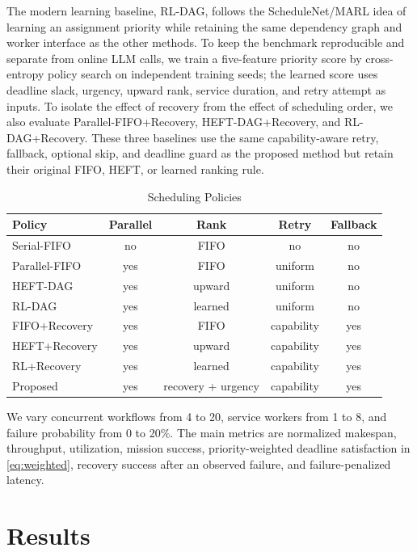 \documentclass[conference]{IEEEtran}
\begin{document}
The modern learning baseline, RL-DAG, follows the ScheduleNet/MARL idea of
learning an assignment priority while retaining the same dependency graph and
worker interface as the other methods. To keep the benchmark reproducible and
separate from online LLM calls, we train a five-feature priority score by
cross-entropy policy search on independent training seeds; the learned score
uses deadline slack, urgency, upward rank, service duration, and retry
attempt as inputs. To isolate the effect of recovery from the effect of
scheduling order, we also evaluate Parallel-FIFO+Recovery, HEFT-DAG+Recovery,
and RL-DAG+Recovery. These three baselines use the same capability-aware
retry, fallback, optional skip, and deadline guard as the proposed method but
retain their original FIFO, HEFT, or learned ranking rule.

\begin{table}[t]
\caption{Scheduling Policies}
\label{tab:policies}
\centering
\scriptsize
\begin{tabular}{p{1.75cm}cccc}
\toprule
\textbf{Policy} & \textbf{Parallel} & \textbf{Rank} & \textbf{Retry} &
\textbf{Fallback}\\
\midrule
Serial-FIFO & no & FIFO & no & no\\
Parallel-FIFO & yes & FIFO & uniform & no\\
HEFT-DAG & yes & upward & uniform & no\\
RL-DAG & yes & learned & uniform & no\\
FIFO+Recovery & yes & FIFO & capability & yes\\
HEFT+Recovery & yes & upward & capability & yes\\
RL+Recovery & yes & learned & capability & yes\\
Proposed & yes & recovery + urgency & capability & yes\\
\bottomrule
\end{tabular}
\end{table}

We vary concurrent workflows from 4 to 20, service workers from 1 to 8, and
failure probability from 0 to 20\%. The main metrics are normalized
makespan, throughput, utilization, mission success,
priority-weighted deadline satisfaction in \eqref{eq:weighted}, recovery
success after an observed failure, and failure-penalized latency.

\section{Results}
\end{document}
